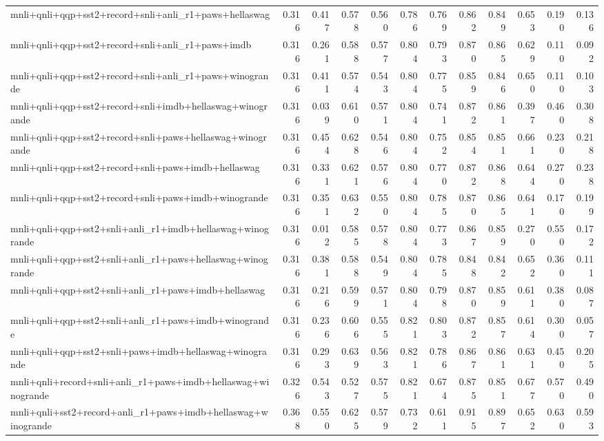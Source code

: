 \begin{table}[t]
\begin{tabular}{lrrrrrrrrrrr}
    mnli+qnli+qqp+sst2+record+snli+anli\_r1+paws+hellaswag & 0.316 & 0.417 & 0.578 & 0.560 & 0.786 & 0.769 & 0.862 & 0.849 & 0.653 & 0.190 & 0.136 \\
    mnli+qnli+qqp+sst2+record+snli+anli\_r1+paws+imdb & 0.316 & 0.261 & 0.588 & 0.577 & 0.804 & 0.793 & 0.870 & 0.865 & 0.629 & 0.110 & 0.092 \\
    mnli+qnli+qqp+sst2+record+snli+anli\_r1+paws+winogrande & 0.316 & 0.411 & 0.574 & 0.543 & 0.804 & 0.775 & 0.859 & 0.846 & 0.650 & 0.110 & 0.103 \\
    mnli+qnli+qqp+sst2+record+snli+imdb+hellaswag+winogrande & 0.316 & 0.039 & 0.610 & 0.571 & 0.804 & 0.741 & 0.872 & 0.861 & 0.397 & 0.460 & 0.308 \\
    mnli+qnli+qqp+sst2+record+snli+paws+hellaswag+winogrande & 0.316 & 0.454 & 0.628 & 0.546 & 0.804 & 0.752 & 0.854 & 0.851 & 0.661 & 0.230 & 0.218 \\
    mnli+qnli+qqp+sst2+record+snli+paws+imdb+hellaswag & 0.316 & 0.331 & 0.621 & 0.576 & 0.804 & 0.770 & 0.872 & 0.868 & 0.644 & 0.270 & 0.238 \\
    mnli+qnli+qqp+sst2+record+snli+paws+imdb+winogrande & 0.316 & 0.351 & 0.632 & 0.550 & 0.804 & 0.785 & 0.870 & 0.865 & 0.641 & 0.170 & 0.199 \\
    mnli+qnli+qqp+sst2+snli+anli\_r1+imdb+hellaswag+winogrande & 0.316 & 0.012 & 0.585 & 0.578 & 0.804 & 0.773 & 0.867 & 0.859 & 0.270 & 0.550 & 0.172 \\
    mnli+qnli+qqp+sst2+snli+anli\_r1+paws+hellaswag+winogrande & 0.316 & 0.381 & 0.588 & 0.549 & 0.804 & 0.785 & 0.848 & 0.842 & 0.652 & 0.360 & 0.111 \\
    mnli+qnli+qqp+sst2+snli+anli\_r1+paws+imdb+hellaswag & 0.316 & 0.216 & 0.599 & 0.571 & 0.804 & 0.798 & 0.870 & 0.859 & 0.611 & 0.380 & 0.087 \\
    mnli+qnli+qqp+sst2+snli+anli\_r1+paws+imdb+winogrande & 0.316 & 0.236 & 0.606 & 0.555 & 0.821 & 0.803 & 0.872 & 0.857 & 0.614 & 0.300 & 0.057 \\
    mnli+qnli+qqp+sst2+snli+paws+imdb+hellaswag+winogrande & 0.316 & 0.293 & 0.639 & 0.563 & 0.821 & 0.786 & 0.867 & 0.861 & 0.631 & 0.450 & 0.205 \\
    mnli+qnli+record+snli+anli\_r1+paws+imdb+hellaswag+winogrande & 0.326 & 0.543 & 0.527 & 0.575 & 0.821 & 0.674 & 0.875 & 0.851 & 0.677 & 0.570 & 0.490 \\
    mnli+qnli+sst2+record+anli\_r1+paws+imdb+hellaswag+winogrande & 0.368 & 0.550 & 0.625 & 0.579 & 0.732 & 0.611 & 0.915 & 0.897 & 0.652 & 0.630 & 0.593 \\

\end{tabular}
\end{table}
